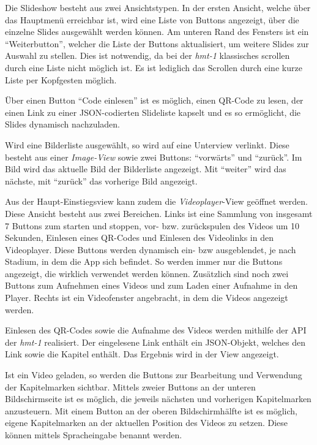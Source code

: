 Die Slideshow besteht aus zwei Ansichtstypen. In der ersten Ansicht, welche über das Hauptmenü erreichbar ist, wird eine Liste von Buttons angezeigt, über die einzelne Slides ausgewählt werden können. Am unteren Rand des Fensters ist ein \enquote{Weiterbutton}, welcher die Liste der Buttons aktualisiert, um weitere Slides zur Auswahl zu stellen. Dies ist notwendig, da bei der \emph{hmt-1} klassisches scrollen durch eine Liste nicht möglich ist. Es ist lediglich das Scrollen durch eine kurze Liste per Kopfgesten möglich.

Über einen Button \enquote{Code einlesen} ist es möglich, einen QR-Code zu lesen, der einen Link zu einer JSON-codierten Slideliste kapselt und es so ermöglicht, die Slides dynamisch nachzuladen.

Wird eine Bilderliste ausgewählt, so wird auf eine Unterview verlinkt. Diese besteht aus einer \emph{Image-View} sowie zwei Buttons: \enquote{vorwärts} und \enquote{zurück}. Im Bild wird das aktuelle Bild der Bilderliste angezeigt. Mit \enquote{weiter} wird das nächste, mit \enquote{zurück} das vorherige Bild angezeigt.

Aus der Haupt-Einstiegsview kann zudem die \emph{Videoplayer}-View geöffnet werden. Diese Ansicht besteht aus zwei Bereichen. Links ist eine Sammlung von insgesamt 7 Buttons zum starten und stoppen, vor- bzw. zurückspulen des Videos um 10 Sekunden, Einlesen eines QR-Codes und Einlesen des Videolinks in den Videoplayer. Diese Buttons werden dynamisch ein- bzw ausgeblendet, je nach Stadium, in dem die App sich befindet. So werden immer nur die Buttons angezeigt, die wirklich verwendet werden können. Zusätzlich sind noch zwei Buttons zum Aufnehmen eines Videos und zum Laden einer Aufnahme in den Player. Rechts ist ein Videofenster angebracht, in dem die Videos angezeigt werden.

Einlesen des QR-Codes sowie die Aufnahme des Videos werden mithilfe der API der \emph{hmt-1} realisiert. Der eingelesene Link enthält ein JSON-Objekt, welches den Link sowie die Kapitel enthält. Das Ergebnis wird in der View angezeigt.

Ist ein Video geladen, so werden die Buttons zur Bearbeitung und Verwendung der Kapitelmarken sichtbar. Mittels zweier Buttons an der unteren Bildschirmseite ist es möglich, die jeweils nächsten und vorherigen Kapitelmarken anzusteuern. Mit einem Button an der oberen Bildschirmhälfte ist es möglich, eigene Kapitelmarken an der aktuellen Position des Videos zu setzen. Diese können mittels Spracheingabe benannt werden.

